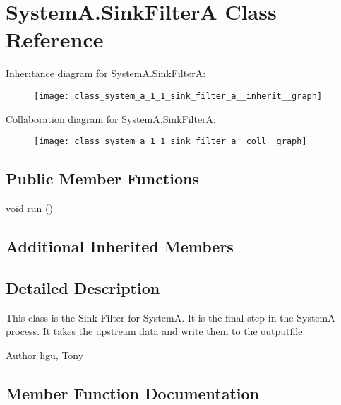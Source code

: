 \hypertarget{class_system_a_1_1_sink_filter_a}{}\section{System\+A.\+Sink\+Filter\+A Class Reference}
\label{class_system_a_1_1_sink_filter_a}


Inheritance diagram for System\+A.\+Sink\+Filter\+A\+:
\nopagebreak
\begin{figure}[H]
\begin{center}
\leavevmode
\texttt{[image: class\_system\_a\_1\_1\_sink\_filter\_a\_\_inherit\_\_graph]}
\end{center}
\end{figure}


Collaboration diagram for System\+A.\+Sink\+Filter\+A\+:
\nopagebreak
\begin{figure}[H]
\begin{center}
\leavevmode
\texttt{[image: class\_system\_a\_1\_1\_sink\_filter\_a\_\_coll\_\_graph]}
\end{center}
\end{figure}
\subsection*{Public Member Functions}
\begin{DoxyCompactItemize}
\item 
void \hyperlink{class_system_a_1_1_sink_filter_a_a1d101cb86c9cdf2ab9dd8e7e47439e15}{run} ()
\end{DoxyCompactItemize}
\subsection*{Additional Inherited Members}


\subsection{Detailed Description}
This class is the Sink Filter for System\+A. It is the final step in the System\+A process. It takes the upstream data and write them to the outputfile. \begin{DoxyAuthor}{Author}
ligu, Tony 
\end{DoxyAuthor}


\subsection{Member Function Documentation}
\hypertarget{class_system_a_1_1_sink_filter_a_a1d101cb86c9cdf2ab9dd8e7e47439e15}{}
